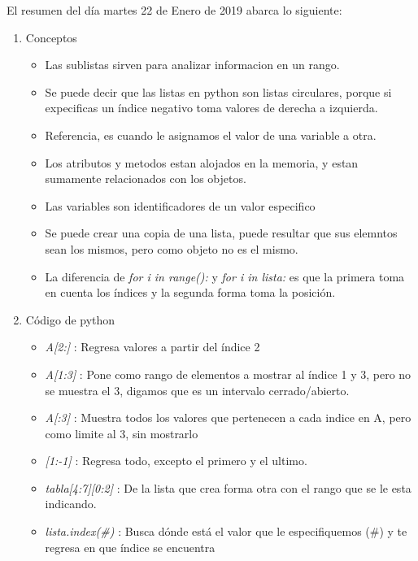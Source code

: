 \documentclass[letterpaper, 12pt,oneside]{article}
\begin{document}
	El resumen del día martes 22 de Enero de 2019 abarca lo siguiente:
	\begin{enumerate}
		\item Conceptos
			\begin{itemize}
				\item Las sublistas sirven para analizar informacion en un rango.
				\item Se puede decir que las listas en python son listas circulares, porque si expecificas un índice negativo toma valores de derecha a izquierda.
				\item Referencia, es cuando le asignamos el valor de una variable a otra.
				\item Los atributos y metodos estan alojados en la memoria, y estan sumamente relacionados con los objetos.
				\item Las variables son identificadores de un valor especifico
				\item Se puede crear una copia de una lista, puede resultar que sus elemntos sean los mismos, pero como objeto no es el mismo.
				\item La diferencia de \textit{for i in range():} y \textit{for i in lista:} es que la primera toma en cuenta los índices y la segunda forma toma la posición.
			\end{itemize}
		
		
		
		\item Código de python
			\begin{itemize}
				\item {\textit{A[2:]}} : Regresa valores a partir del índice 2
				\item {\textit{A[1:3]}} : Pone como rango de elementos a mostrar al índice 1 y 3, pero no se muestra el 3, digamos que es un intervalo cerrado/abierto.
				\item {\textit{A[:3]}} : Muestra todos los valores que pertenecen a cada indice en A, pero como limite al 3, sin mostrarlo
				\item {\textit{[1:-1]}} : Regresa todo, excepto el primero y el ultimo.
			
				\item {\textit{tabla[4:7][0:2]}} : De la lista que crea forma otra con el rango que se le esta indicando.
					
				\item {\textit{lista.index(\#)}} : Busca dónde está el valor que le especifiquemos (\#) y te regresa en que índice se encuentra
			

\end{itemize}
\end{enumerate}
\end{document}
